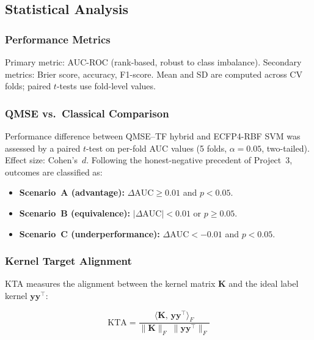 
\subsection{Statistical Analysis}
\label{sec:stats}

\subsubsection{Performance Metrics}

Primary metric: AUC-ROC (rank-based, robust to class imbalance).
Secondary metrics: Brier score, accuracy, F1-score. Mean and SD are
computed across CV folds; paired $t$-tests use fold-level values.

\subsubsection{QMSE vs.\ Classical Comparison}

Performance difference between QMSE--TF hybrid and ECFP4-RBF SVM was
assessed by a paired $t$-test on per-fold AUC values (5 folds,
$\alpha = 0.05$, two-tailed). Effect size: Cohen's~$d$. Following the
honest-negative precedent of Project~3\cite{sao2026p3}, outcomes are
classified as:

\begin{itemize}
  \item \textbf{Scenario~A (advantage):}
        $\Delta\text{AUC} \geq 0.01$ and $p < 0.05$.
  \item \textbf{Scenario~B (equivalence):}
        $|\Delta\text{AUC}| < 0.01$ or $p \geq 0.05$.
  \item \textbf{Scenario~C (underperformance):}
        $\Delta\text{AUC} < -0.01$ and $p < 0.05$.
\end{itemize}

\subsubsection{Kernel Target Alignment}
\label{sec:kta}

KTA\cite{cristianini2002} measures the alignment between the kernel matrix
$\mathbf{K}$ and the ideal label kernel $\mathbf{y}\mathbf{y}^\top$:

\begin{equation}
\text{KTA} = \frac{
  \langle \mathbf{K},\, \mathbf{y}\mathbf{y}^\top \rangle_F
}{
  \|\mathbf{K}\|_F\; \|\mathbf{y}\mathbf{y}^\top\|_F
}
\end{equation}

